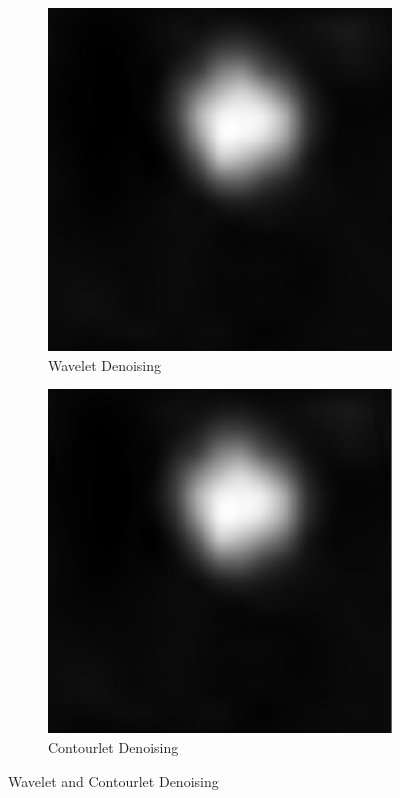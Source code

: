 \begin{figure}[h]
	\centering
	\begin{subfigure}{.5\textwidth}
		\centering
		\includegraphics[width=.8\linewidth]{fig/wavelet}
		\caption{Wavelet Denoising}
		\label{fig:sub1}
	\end{subfigure}%
	\begin{subfigure}{.5\textwidth}
		\centering
		\includegraphics[width=.8\linewidth]{fig/contourlet.jpg}
		\caption{Contourlet Denoising}
		\label{fig:sub2}
	\end{subfigure}
	\caption{Wavelet and Contourlet Denoising}
	\label{fig:de1}
\end{figure}

